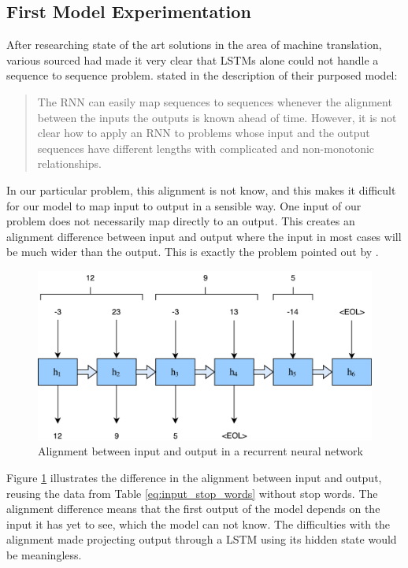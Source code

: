 \subsection{First Model Experimentation}
After researching state of the art solutions in the area of machine translation, various sourced had made it very clear that LSTMs alone could not handle a sequence to sequence problem. \citep{sutskever2014sequence} stated in the description of their purposed model:

\begin{quote}
    The RNN can easily map sequences to sequences whenever the alignment between the inputs the outputs is known ahead of time. However, it is not clear how to apply an RNN to problems whose input and the output sequences have different lengths with complicated and non-monotonic relationships.
\end{quote}

In our particular problem, this alignment is not know, and this makes it difficult for our model to map input to output in a sensible way. One input of our problem does not necessarily map directly to an output. This creates an alignment difference between input and output where the input in most cases will be much wider than the output. This is exactly the problem pointed out by \citep{sutskever2014sequence}.

\begin{figure}[H]
    \centering
    \includegraphics[width=1\textwidth]{fig/development_process/lstm-alignment.pdf}
    \caption{Alignment between input and output in a recurrent neural network}
    \label{fig:lstm-alignment}
\end{figure}

Figure \ref{fig:lstm-alignment} illustrates the difference in the alignment between input and output, reusing the data from Table \ref{eq:input_stop_words} without stop words. The alignment difference means that the first output of the model depends on the input it has yet to see, which the model can not know. The difficulties with the alignment made projecting output through a LSTM using its hidden state would be meaningless. 

